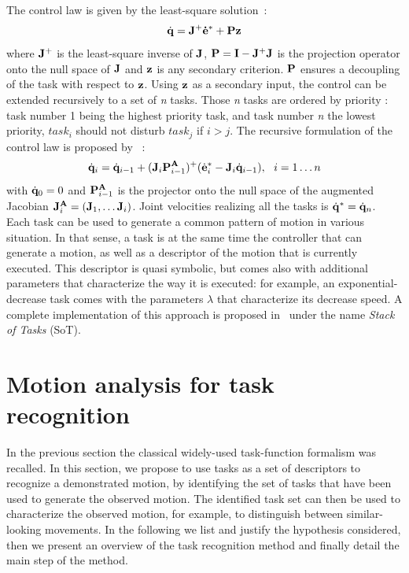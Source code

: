 \documentclass[journal]{IEEEtran}
\begin{document}
The control law is given by the least-square solution~\cite{liegeois77}:
\begin{equation}
\dot{\mbf{q}} = \mbf{J}^+ \mbf{\dot{e}}^* + \mbf{P}\mbf{z}
\label{eq:ltsq}
\end{equation}
where ${\mathbf{J}}^+$ is the least-square inverse of ${\mathbf{J}}$,
${\mathbf{P}} = {\mathbf{I}} - {\mathbf{J}}^+ {\mathbf{J}}$ is the projection operator onto the null space
of ${\mathbf{J}}$ and ${\mathbf{z}}$ is any secondary criterion. ${\mathbf{P}}$ ensures
a decoupling of the task with respect to ${\mathbf{z}}$.
Using ${\mathbf{z}}$ as a secondary input, the control can be extended
recursively to a set of \emph{n} tasks. Those \emph{n} tasks
are ordered by priority : task number 1 being the highest priority task,
and task number \emph{n} the lowest priority,
$task_i$ should not disturb $task_j$ if $i>j$.
The recursive formulation of the control law is proposed by~\cite{siciliano91} :
\begin{equation}
\dot{{\mathbf{q}}}_i = \dot{{\mathbf{q}}}_{i-1} + ({\mathbf{J}}_i {\mathbf{P}}_{i-1}^{{\mathbf{A}}})^+
(\dot{{\mathbf{e}}}^*_i - {\mathbf{J}}_i \dot{{\mathbf{q}}}_{i-1}) , \ \ i = 1 \ldots n
\end{equation}
\noindent with $\dot{{\mathbf{q}}}_0 = 0$ and ${\mathbf{P}}_{i-1}^{{\mathbf{A}}}$ is
the projector onto the null space of the augmented Jacobian
${\mathbf{J}}_i^{{\mathbf{A}}} = ({\mathbf{J}}_1, \ldots {\mathbf{J}}_i)$. Joint velocities realizing all
the tasks is $\dot{{\mathbf{q}}}^* = \dot{{\mathbf{q}}}_n$.
Each task can be used to generate a common pattern of motion in various situation.
In that sense, a task is at the same time the controller that can
generate a motion, as well as a descriptor of the motion that is currently executed.
This descriptor is quasi symbolic, but comes also with additional parameters
that characterize the way it is executed: for example, an exponential-decrease task
comes with the parameters $\lambda$ that characterize its decrease speed.
A complete implementation of this approach is proposed in~\cite{mansard07} under the
name \emph{Stack of Tasks} (SoT).

\section{Motion analysis for task recognition}
\label{sec:detect}
\label{section:algorithm}
In the previous section the classical widely-used task-function formalism was recalled.
In this section,
we propose to use tasks as a set of descriptors to recognize a demonstrated motion,
by identifying the set of tasks that have been used to
generate the observed motion.
The identified task set can then be used to characterize the observed motion, for
example, to distinguish between similar-looking movements.
In the following we list and justify the hypothesis considered, then we
present an overview of the task recognition method and finally detail the main step
of the method.
\end{document}
